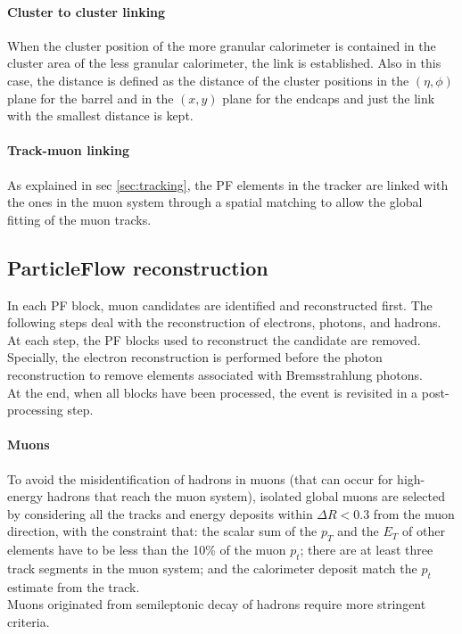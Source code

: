 \paragraph*{Cluster to cluster linking}
When the cluster position of the more granular calorimeter is contained in the cluster area of the less granular calorimeter, the link is established.
Also in this case, the distance is defined as the distance of the cluster positions in the $(\eta,\phi)$ plane for the barrel and in the $(x,y)$ plane for the endcaps and just the link with the smallest distance is kept.

\paragraph*{Track-muon linking}
As explained in sec \ref{sec:tracking}, the PF elements in the tracker are linked with the ones in the muon system through a spatial matching to allow the global fitting of the muon tracks.



\subsection{ParticleFlow reconstruction}
In each PF block, muon candidates are identified and reconstructed first. The following steps deal with the reconstruction of electrons, photons, and hadrons.
At each step, the PF blocks used to reconstruct the candidate are removed. Specially, the electron reconstruction is performed before the photon reconstruction to remove elements associated with Bremsstrahlung photons.\\
At the end, when all blocks have been processed, the event is revisited in a post-processing step.

\paragraph*{Muons}
To avoid the misidentification of hadrons in muons (that can occur for high-energy hadrons that reach the muon system), isolated global muons are selected by considering all the tracks and energy deposits within $\Delta R<0.3$ from the muon direction, with the constraint that: the scalar sum of the $p_T$ and the $E_T$ of other elements have to be less than the 10\% of the muon $p_t$; there are at least three track segments in the muon system; and the calorimeter deposit match the $p_t$ estimate from the track.\\
Muons originated from semileptonic decay of hadrons require more stringent criteria.

